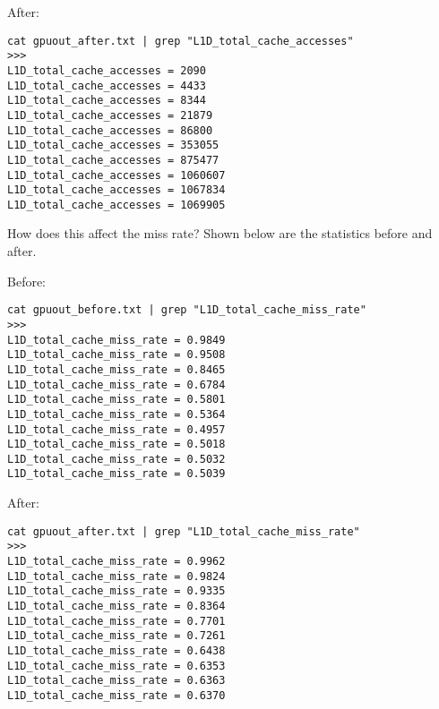 \documentclass{article}
\begin{document}
After:
\begin{verbatim}
cat gpuout_after.txt | grep "L1D_total_cache_accesses"
>>>
L1D_total_cache_accesses = 2090
L1D_total_cache_accesses = 4433
L1D_total_cache_accesses = 8344
L1D_total_cache_accesses = 21879
L1D_total_cache_accesses = 86800
L1D_total_cache_accesses = 353055
L1D_total_cache_accesses = 875477
L1D_total_cache_accesses = 1060607
L1D_total_cache_accesses = 1067834
L1D_total_cache_accesses = 1069905
\end{verbatim}

How does this affect the miss rate? Shown below are the statistics before and after.

Before:
\begin{verbatim}
cat gpuout_before.txt | grep "L1D_total_cache_miss_rate"
>>>
L1D_total_cache_miss_rate = 0.9849
L1D_total_cache_miss_rate = 0.9508
L1D_total_cache_miss_rate = 0.8465
L1D_total_cache_miss_rate = 0.6784
L1D_total_cache_miss_rate = 0.5801
L1D_total_cache_miss_rate = 0.5364
L1D_total_cache_miss_rate = 0.4957
L1D_total_cache_miss_rate = 0.5018
L1D_total_cache_miss_rate = 0.5032
L1D_total_cache_miss_rate = 0.5039
\end{verbatim}

After:
\begin{verbatim}
cat gpuout_after.txt | grep "L1D_total_cache_miss_rate"
>>>
L1D_total_cache_miss_rate = 0.9962
L1D_total_cache_miss_rate = 0.9824
L1D_total_cache_miss_rate = 0.9335
L1D_total_cache_miss_rate = 0.8364
L1D_total_cache_miss_rate = 0.7701
L1D_total_cache_miss_rate = 0.7261
L1D_total_cache_miss_rate = 0.6438
L1D_total_cache_miss_rate = 0.6353
L1D_total_cache_miss_rate = 0.6363
L1D_total_cache_miss_rate = 0.6370
\end{verbatim}


\end{document}
